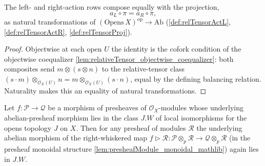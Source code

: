 \begin{lemma}
  \label{lem:snap_relTensorActL_proj_eq}
  The left- and right-action rows compose equally with the projection,
  \[
    a_L \circ \pi = a_R \circ \pi,
  \]
  as natural transformations of \((\mathrm{Opens}\,X)^{\mathrm{op}} \to
  \mathrm{Ab}\) (\cref{def:relTensorActL}, \cref{def:relTensorActR},
  \cref{def:relTensorProj}).
\end{lemma}

\begin{proof}
  Objectwise at each open \(U\) the identity is the cofork condition of the
  objectwise coequalizer \cref{lem:relativeTensor_objectwise_coequalizer}: both
  composites send \(m \otimes (s \otimes n)\) to the relative-tensor class
  \((s \cdot m) \otimes_{\mathcal{O}_X(U)} n = m \otimes_{\mathcal{O}_X(U)}
  (s \cdot n)\), equal by the defining balancing relation. Naturality makes this
  an equality of natural transformations.
\end{proof}

\begin{lemma}
  \label{lem:snap_ztensor_whisker_localIso}
  Let \(f : \mathcal{P} \to \mathcal{Q}\) be a morphism of presheaves of
  \(\mathcal{O}_X\)-modules whose underlying abelian-presheaf morphism lies in the
  class \(J.W\) of local isomorphisms for the opens topology \(J\) on \(X\). Then
  for any presheaf of modules \(\mathcal{R}\) the underlying abelian morphism of
  the right-whiskered map \(f \rhd \mathcal{R} : \mathcal{P} \otimes_p \mathcal{R}
  \to \mathcal{Q} \otimes_p \mathcal{R}\) (in the presheaf monoidal structure
  \cref{lem:presheafModule_monoidal_mathlib}) again lies in \(J.W\).
\end{lemma}

